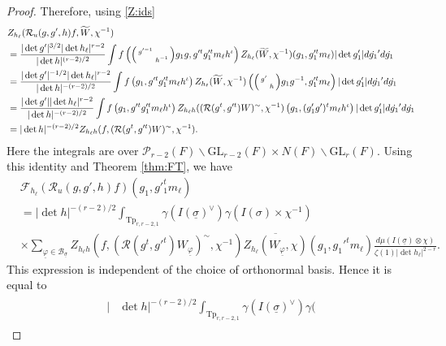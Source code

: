 \documentclass[12pt]{amsart}
\theoremstyle{remark}
\numberwithin{equation}{section}
\newcommand{\GL}{\mathrm{GL}}
\theoremstyle{definition}
\newenvironment{psmatrix}
  {\left(\begin{smallmatrix}}
  {\end{smallmatrix}\right)}
\numberwithin{equation}{subsection}
\begin{document}
\begin{proof}
Therefore, using \eqref{Z:ids}
\begin{align*}
    &Z_{h_\ell}(\mathcal{R}_u(g,g',h)f,\widetilde{W},\chi^{-1})\\
    &=\frac{|\det g'|^{3/2}|\det h_\ell|^{r-2}}{|\det h|^{(r-2)/2}}\int f\left(\begin{psmatrix}
        g'^{-1} & \\
        & h^{-1}\end{psmatrix}g_1g,g'^tg_1'^tm_\ell h^{\iota}\right)Z_{h_\ell}(\widetilde{W},\chi^{-1})(g_1,g_1'^tm_\ell) |\det g_1'|d\dot{g_1}'d\dot{g_1}\\
    &= \frac{|\det g'|^{-1/2}|\det h_\ell|^{r-2}}{|\det h|^{-(r-2)/2}}\int f\left(g_1,g'^tg_1'^tm_\ell h^{\iota}\right)Z_{h_\ell}(\widetilde{W},\chi^{-1})\left(\begin{psmatrix}
        g' & \\
        & h\end{psmatrix}g_1g^{-1},g_1'^tm_\ell\right) |\det g_1'|d\dot{g_1}'d\dot{g_1}\\
        &=\frac{|\det g'||\det h_\ell|^{r-2}}{|\det h|^{-(r-2)/2}}\int f\left(g_1,g'^tg_1'^tm_\ell h^{\iota}\right)Z_{h_\ell h}((\mathcal{R}(g^{t},g'^{t}) W)^{\sim},\chi^{-1})\left(g_1,(g_1'g')^tm_\ell h^\iota\right) |\det g_1'|d\dot{g_1}'d\dot{g_1}\\
        &=|\det h|^{-(r-2)/2}Z_{h_\ell h}(f,(\mathcal{R}(g^{t},g'^{t}) W)^{\sim},\chi^{-1}).
\end{align*}
Here the integrals are over $\mathcal{P}_{r-2}(F) \backslash \GL_{r-2}(F) \times N(F) \backslash \GL_r(F).$
Using this identity and Theorem \ref{thm:FT}, we have 
\begin{align*}
&\mathcal{F}_{h_\ell}(\mathcal{R}_u(g,g',h)f)(g_1,g'^t_1m_{\ell})\\
    &=|\det h|^{-(r-2)/2}\int_{\mathrm{Tp}_{r,r-2,1}}\gamma(I(\underline{\sigma})^\vee)\gamma(
  I(\sigma)\times\chi^{-1})\\& \times 
    \sum_{\underline{\varphi} \in \mathcal{B}_{\underline{\sigma}}}
    Z_{h_\ell h}(f,(\mathcal{R}(g^t,g'^t)W_{\underline{\varphi}})^{\sim},\chi^{-1})\overline{Z_{h_\ell}(W_{\underline{\varphi}},\chi)}(g_1,g_1'^tm_{\ell})\frac{d\mu(I(\underline{\sigma}) \otimes \chi)}{\zeta(1)|\det h_\ell|^{2-r}}.
\end{align*}
This expression is independent of the choice of orthonormal basis.  Hence it is equal to
\begin{align} \label{Fh}\begin{split}
|&\det h|^{-(r-2)/2}\int_{\mathrm{Tp}_{r,r-2,1}}\gamma(I(\underline{\sigma})^\vee)\gamma(

\end{split}
\end{align}
\end{proof}
\end{document}
